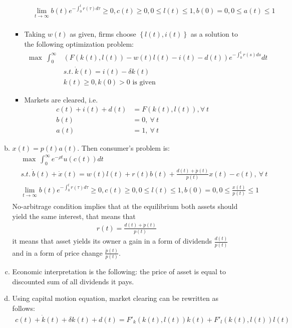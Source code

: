 \documentclass[a4paper]{article}
\begin{document}
\begin{enumerate}[1.]
\begin{enumerate}[(a)]
\begin{itemize}
\begin{align*}
			&\lim_{t \to \infty} b(t)e^{-\int_{0}^t r(\tau)d\tau} \ge 0, c(t) \ge 0, 0 \le l(t) \le 1, b(0) = 0, 0 \le a(t) \le 1\\
			\end{align*}
			\item Taking $w(t)$ as given, firms choose $\left\{l(t), i(t)\right\}$ as a solution to the following optimization problem:
			\begin{align*}
			\max\ \int_{0}^{\infty} &(F(k(t), l(t)) - w(t)l(t) - i(t) - d(t))e^{-\int_0^tr(s)ds}dt\\
			&s.t.\ \dot{k}(t) = i(t) - \delta k(t)\\
			&k(t) \ge 0, k(0) > 0 \text{ is given}
			\end{align*}
			\item Markets are cleared, i.e.
			\begin{align*}
			c(t) + i(t) + d(t)&= F(k(t), l(t)), \forall\ t\\
			b(t) &= 0,\ \forall\ t\\
			a(t) &= 1,\ \forall\ t
			\end{align*}
		\end{itemize}
	\item $x(t) = p(t)a(t)$. Then consumer's problem is:
	\begin{align*}
	&\max\ \int_{0}^{\infty} e^{-\rho t}u(c(t))dt\\
	&s.t.\ \dot{b}(t) + \dot{x}(t) = w(t)l(t) + r(t)b(t) + \frac{d(t) + \dot{p}(t)}{p(t)}x(t) - c(t),\ \forall\ t\\
	&\lim_{t \to \infty} b(t)e^{-\int_{0}^t r(\tau)d\tau} \ge 0, c(t) \ge 0, 0 \le l(t) \le 1, b(0) = 0,0 \le \frac{x(t)}{p(t)} \le 1\\
	\end{align*}
	No-arbitrage condition implies that at the equilibrium both assets should yield the same interest, that means that
	\begin{align*}
	r(t) = \frac{d(t) + \dot{p}(t)}{p(t)}
	\end{align*}
	it means that asset yields its owner a gain in a form of dividends $\frac{d(t)}{p(t)}$ and in a form of price change $\frac{\dot{p}(t)}{p(t)}$.
	\item Economic interpretation is the following: the price of asset is equal to discounted sum of all dividends it pays.
	\item Using capital motion equation, market clearing can be rewritten as follows:
	\begin{align*}
	c(t) + \dot{k}(t) + \delta k(t) + d(t) = F'_k(k(t), l(t))k(t) + F'_l(k(t), l(t))l(t)\\

\end{align*}
\end{enumerate}
\end{enumerate}
\end{document}
